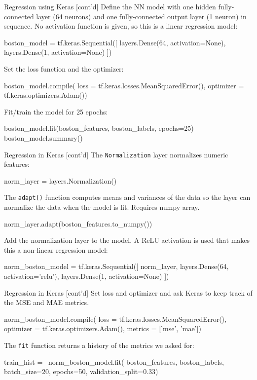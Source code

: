 \documentclass[ignorenonframetext,xcolor=x11names]{beamer}
\begin{document}
\begin{frame}[fragile]{Regression using Keras \small [cont'd]}
Define the NN model with one hidden fully-connected layer (64 neurons) and one fully-connected output layer (1 neuron) in sequence. No activation function is given, so this is a linear regression model:
\begin{pythoncode}
boston_model = tf.keras.Sequential([
  layers.Dense(64, activation=None),
  layers.Dense(1, activation=None)
])
\end{pythoncode}
Set the loss function and the optimizer:
\begin{pythoncode}
boston_model.compile(
    loss = tf.keras.losses.MeanSquaredError(),
    optimizer = tf.keras.optimizers.Adam())
\end{pythoncode}
Fit/train the model for 25 epochs:
\begin{pythoncode}
boston_model.fit(boston_features, 
                 boston_labels, epochs=25)
boston_model.summary()
\end{pythoncode}
\end{frame}

\begin{frame}[fragile]{Regression in Keras \small [cont'd]}
The \texttt{Normalization} layer normalizes numeric features:
\begin{pythoncode}
norm_layer = layers.Normalization()
\end{pythoncode}
The \texttt{adapt()} function computes means and variances of the data so the layer can normalize the data when the model is fit. Requires numpy array.
\begin{pythoncode}
norm_layer.adapt(boston_features.to_numpy())
\end{pythoncode}
Add the normalization layer to the model. A ReLU activation is used that makes this a non-linear regression model:
\begin{pythoncode}
norm_boston_model = tf.keras.Sequential([
  norm_layer,
  layers.Dense(64, activation='relu'),
  layers.Dense(1, activation=None)
])
\end{pythoncode}
\end{frame}

\begin{frame}[fragile]{Regression in Keras \small [cont'd]}
Set loss and optimizer and ask Keras to keep track of the MSE and MAE metrics.
\begin{pythoncode}
norm_boston_model.compile(
    loss = tf.keras.losses.MeanSquaredError(),
    optimizer = tf.keras.optimizers.Adam(),
    metrics = ['mse', 'mae'])
\end{pythoncode}
The \texttt{fit} function returns a history of the metrics we asked for:
\begin{pythoncode}    
train_hist = \
    norm_boston_model.fit(
        boston_features, 
        boston_labels, 
        batch_size=20,
        epochs=50,
        validation_split=0.33)
\end{pythoncode}
\end{frame}
\end{document}
